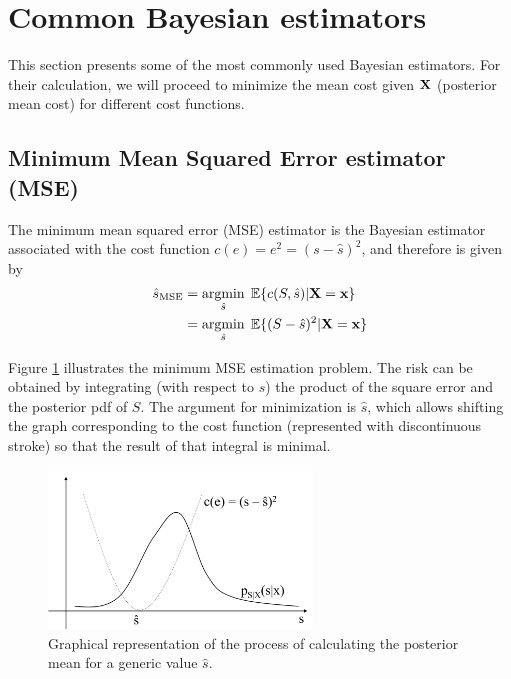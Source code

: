 \newpage

\section{Common Bayesian estimators}

This section presents some of the most commonly used Bayesian estimators. For their calculation, we will proceed to minimize the mean cost given $\bf X$ (posterior mean cost) for different cost functions.


\subsection{Minimum Mean Squared Error estimator (MSE)}

The minimum mean squared error (MSE) estimator is the Bayesian estimator associated with the cost function $c(e) = e^2 = (s-\hat s)^2$, and therefore is given by 
\begin{align}
\label{ec:coste_medio_cuadratico}
\hat{s}_\text{MSE} 
  & = \operatorname*{argmin}_{\hat s} \; \mathbb{E}\{c(S,\hat s)|{\bf X} = {\bf x} \}   \nonumber\\
  & = \operatorname*{argmin}_{\hat s} \; \mathbb{E}\{(S-\hat s)^2|{\bf X} = {\bf x} \}
\end{align}

Figure \ref{fig:estimador_cuadratico} illustrates the minimum MSE estimation problem. The risk can be obtained by integrating (with respect to $s$) the product of the square error and the posterior pdf of $S$. The argument for minimization is $\hat s$, which allows shifting the graph corresponding to the cost function (represented with discontinuous stroke) so that the result of that integral is minimal.

\begin{figure}[th]
  \begin{center}
    \includegraphics[width=7cm]{Figures//estimador_cuadratico.png}
    \caption{Graphical representation of the process of calculating the posterior mean for a generic value $\hat{s}$.}
    \label{fig:estimador_cuadratico}
  \end{center}
\end{figure}

